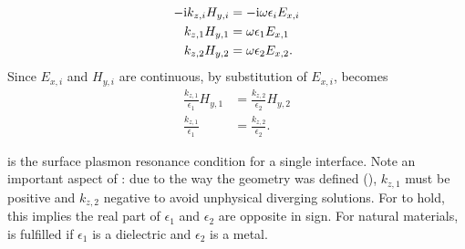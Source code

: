 \begin{align}
-{\mathrm{i}} k_{z,i} H_{y,i} &= -{\mathrm{i}} \omega \epsilon_i E_{x,i}\\
k_{z,1} H_{y,1} &= \omega \epsilon_1 E_{x,1}\\
k_{z,2} H_{y,2} &= \omega \epsilon_2 E_{x,2}.
\label{eqn:spderivsteptwo}
\end{align}
Since $E_{x,i}$ and $H_{y,i}$ are continuous,
by substitution of $E_{x,i}$,  becomes
\begin{align}
\frac{k_{z,1}}{\epsilon_1}H_{y,1}&=\frac{k_{z,2}}{\epsilon_2}H_{y,2}\\ 
\frac{k_{z,1}}{\epsilon_1}&=\frac{k_{z,2}}{\epsilon_2}.
\label{eqn:sprcondition}
\end{align}

 is the surface plasmon resonance condition for
a single interface.  Note an important aspect of
:  due to the way the geometry was defined
(), $k_{z,1}$ must be positive and $k_{z,2}$
negative to avoid unphysical diverging solutions.  For
 to hold, this implies the real part of
$\epsilon_1$ and $\epsilon_2$ are opposite in sign.  For natural materials,
 is fulfilled if $\epsilon_1$ is a dielectric
and $\epsilon_2$ is a metal.
